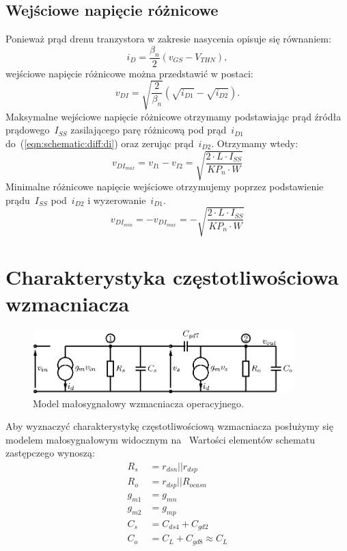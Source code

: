 \documentclass[twoside,pl,final]{labman}
\begin{document}
\subsection{Wejściowe napięcie różnicowe}
\label{schematic:diff}
Ponieważ prąd drenu tranzystora w zakresie nasycenia opisuje się równaniem:
\begin{equation}
  i_D = \frac{\beta_n}{2}(v_{GS} - V_{THN}),
\end{equation}
wejściowe napięcie różnicowe można przedstawić w postaci:
\begin{equation}
  v_{DI} = \sqrt{\frac{2}{\beta_n}}(\sqrt{i_{D1}} - \sqrt{i_{D2}}).
  \label{eqn:schematic:diff:di}
\end{equation}
Maksymalne wejściowe napięcie różnicowe otrzymamy podstawiając prąd źródła
prądowego~$I_{SS}$ zasilającego parę różnicową
pod prąd~$i_{D1}$ do~(\ref{eqn:schematic:diff:di}) oraz zerując prąd~$i_{D2}$.
Otrzymamy wtedy:
\begin{equation}
  v_{DI_{max}} =
  v_{I1} - v_{I2} =
  \sqrt{\frac{2 \cdot L \cdot I_{SS}}{KP_n \cdot W}}
  \label{eqn:schematic:diff:di:max}
\end{equation}
Minimalne różnicowe napięcie wejściowe otrzymujemy poprzez
podstawienie prądu~$I_{SS}$ pod~$i_{D2}$ i wyzerowanie~$i_{D1}$.
\begin{equation}
  v_{DI_{min}} =
  - v_{DI_{max}} =
  - \sqrt{\frac{2 \cdot L \cdot I_{SS}}{KP_n \cdot W}}
\end{equation}

\section{Charakterystyka częstotliwościowa wzmacniacza}
\label{freq}
\begin{figure}[!htbp]
  \centering
  \includegraphics[width=0.9\textwidth]{smallsignal}
  \caption{Model małosygnałowy wzmacniacza operacyjnego.}
  \label{fig:smallsignal}
\end{figure}

Aby wyznaczyć charakterystykę częstotliwościową wzmacniacza posłużymy się
modelem małosygnałowym widocznym na~
Wartości elementów schematu zastępczego wynoszą:
\begin{align}
  R_s &= r_{dsn} || r_{dsp}        \nonumber \\
  R_o &= r_{dsp} || R_{ocasn}      \nonumber \\
  g_{m1} &= g_{mn}                 \nonumber \\
  g_{m2} &= g_{mp}                 \nonumber \\
  C_s &= C_{ds4} + C_{gd2}         \nonumber \\
  C_o &= C_L + C_{gd8} \approx C_L \nonumber
\end{align}
\end{document}
